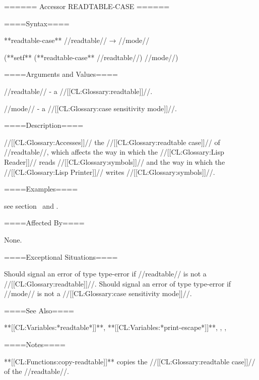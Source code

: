 ====== Accessor READTABLE-CASE ======

====Syntax====

**readtable-case** //readtable// → //mode//

(**setf** (**readtable-case** //readtable//) //mode//)

====Arguments and Values====

//readtable// - a //[[CL:Glossary:readtable]]//.

//mode// - a //[[CL:Glossary:case sensitivity mode]]//.

====Description====

//[[CL:Glossary:Accesses]]// the //[[CL:Glossary:readtable case]]// of //readtable//, which affects the way in which the //[[CL:Glossary:Lisp Reader]]// reads //[[CL:Glossary:symbols]]// and the way in which the //[[CL:Glossary:Lisp Printer]]// writes //[[CL:Glossary:symbols]]//.

====Examples====

see section {\secref\ReadtableCaseReadExamples}\ and \secref\ReadtableCasePrintExamples.

====Affected By====

None.

====Exceptional Situations====

Should signal an error of type type-error if //readtable// is not a //[[CL:Glossary:readtable]]//. Should signal an error of type type-error if //mode// is not a //[[CL:Glossary:case sensitivity mode]]//.

====See Also====

**[[CL:Variables:*readtable*]]**, **[[CL:Variables:*print-escape*]]**, {\secref\ReaderAlgorithm}, {\secref\ReadtableCaseReadEffect}, {\secref\ReadtableCasePrintEffect}

====Notes====

**[[CL:Functions:copy-readtable]]** copies the //[[CL:Glossary:readtable case]]// of the //readtable//.

